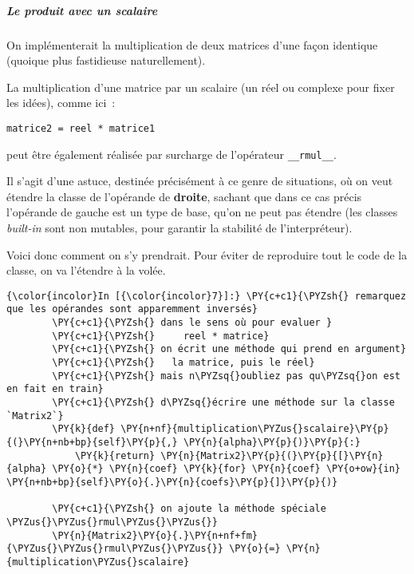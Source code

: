     \hypertarget{le-produit-avec-un-scalaire}{%
\subparagraph{Le produit avec un
scalaire}\label{le-produit-avec-un-scalaire}}

    On implémenterait la multiplication de deux matrices d'une façon
identique (quoique plus fastidieuse naturellement).

La multiplication d'une matrice par un scalaire (un réel ou complexe
pour fixer les idées), comme ici~:

\begin{verbatim}
matrice2 = reel * matrice1
\end{verbatim}

peut être également réalisée par surcharge de l'opérateur
\texttt{\_\_rmul\_\_}.

Il s'agit d'une astuce, destinée précisément à ce genre de situations,
où on veut étendre la classe de l'opérande de \textbf{droite}, sachant
que dans ce cas précis l'opérande de gauche est un type de base, qu'on
ne peut pas étendre (les classes \emph{built-in} sont non mutables, pour
garantir la stabilité de l'interpréteur).

Voici donc comment on s'y prendrait. Pour éviter de reproduire tout le
code de la classe, on va l'étendre à la volée.

    \begin{Verbatim}[commandchars=\\\{\}]
{\color{incolor}In [{\color{incolor}7}]:} \PY{c+c1}{\PYZsh{} remarquez que les opérandes sont apparemment inversés}
        \PY{c+c1}{\PYZsh{} dans le sens où pour evaluer }
        \PY{c+c1}{\PYZsh{}     reel * matrice}
        \PY{c+c1}{\PYZsh{} on écrit une méthode qui prend en argument}
        \PY{c+c1}{\PYZsh{}   la matrice, puis le réel}
        \PY{c+c1}{\PYZsh{} mais n\PYZsq{}oubliez pas qu\PYZsq{}on est en fait en train}
        \PY{c+c1}{\PYZsh{} d\PYZsq{}écrire une méthode sur la classe `Matrix2`}
        \PY{k}{def} \PY{n+nf}{multiplication\PYZus{}scalaire}\PY{p}{(}\PY{n+nb+bp}{self}\PY{p}{,} \PY{n}{alpha}\PY{p}{)}\PY{p}{:}
            \PY{k}{return} \PY{n}{Matrix2}\PY{p}{(}\PY{p}{[}\PY{n}{alpha} \PY{o}{*} \PY{n}{coef} \PY{k}{for} \PY{n}{coef} \PY{o+ow}{in} \PY{n+nb+bp}{self}\PY{o}{.}\PY{n}{coefs}\PY{p}{]}\PY{p}{)}
        
        \PY{c+c1}{\PYZsh{} on ajoute la méthode spéciale \PYZus{}\PYZus{}rmul\PYZus{}\PYZus{}}
        \PY{n}{Matrix2}\PY{o}{.}\PY{n+nf+fm}{\PYZus{}\PYZus{}rmul\PYZus{}\PYZus{}} \PY{o}{=} \PY{n}{multiplication\PYZus{}scalaire}
\end{Verbatim}


